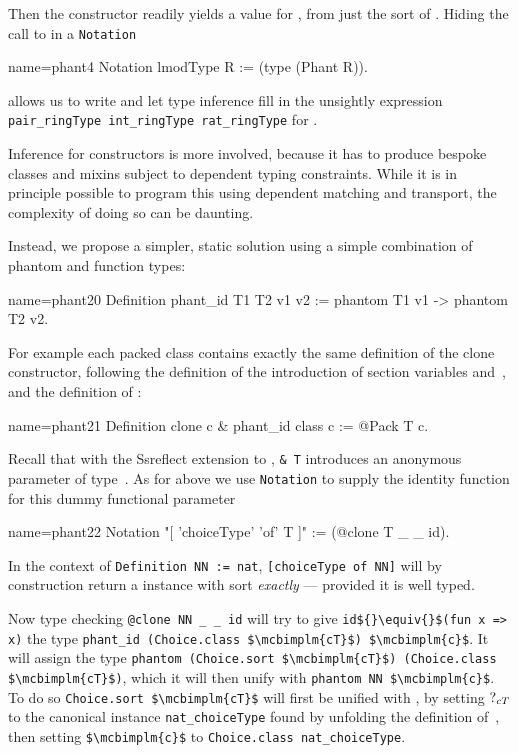 Then the  constructor readily yields a value for ,
from just the sort of . Hiding the call to  in
a \lstinline/Notation/

\begin{coq}{name=phant4}{}
Notation lmodType R := (type (Phant R)).
\end{coq}

allows us to write  and let type inference
fill in the unsightly expression
\lstinline/pair_ringType int_ringType rat_ringType/ for .

Inference for constructors is more involved, because it has to produce
bespoke classes and mixins subject to dependent typing constraints.
While it is in principle possible to program this using dependent
matching and transport, the complexity of doing so can be daunting.

Instead, we propose a simpler, static solution using a simple combination
of phantom and function types:

\begin{coq}{name=phant20}{}
Definition phant_id T1 T2 v1 v2 := phantom T1 v1 -> phantom T2 v2.
\end{coq}

For example each packed class contains exactly the same definition of
the clone constructor, following the definition of the introduction of
section variables  and~, and the definition of :

\begin{coq}{name=phant21}{}
Definition clone c & phant_id class c := @Pack T c.
\end{coq}

Recall that with the {\sc Ssreflect} extension to \Coq{}, \lstinline/& T/
introduces an anonymous parameter of type~. As for 
above we use \lstinline/Notation/ to supply the identity function
for this dummy functional parameter

\begin{coq}{name=phant22}{}
Notation "[ 'choiceType' 'of' T ]" := (@clone T _ _ id).
\end{coq}

In the context of \lstinline/Definition NN := nat/,
\lstinline/[choiceType of NN]/ will by construction return a 
instance with sort \emph{exactly}  --- provided it is well typed.

Now type checking
\lstinline/@clone NN _ _ id/ will try to give
\lstinline/id${}\equiv{}$(fun x => x)/ the type
\lstinline/phant_id (Choice.class $\mcbimplm{cT}$) $\mcbimplm{c}$/.
It will assign  the type
\lstinline/phantom (Choice.sort $\mcbimplm{cT}$) (Choice.class $\mcbimplm{cT}$)/,
which it will then unify with \lstinline/phantom NN $\mcbimplm{c}$/.
To do so \lstinline/Choice.sort $\mcbimplm{cT}$/
will first be unified with ,
by setting $\mbox{?}_{cT}$ to the canonical instance
\lstinline/nat_choiceType/ found by unfolding the definition of~,
then setting \lstinline/$\mcbimplm{c}$/
to \lstinline/Choice.class nat_choiceType/.

